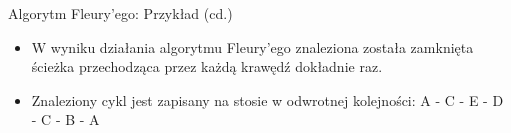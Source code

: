 \documentclass[polish,envcountsect,10pt]{beamer}
\begin{document}
\begin{frame}{Algorytm Fleury'ego: Przykład (cd.)}
    \begin{itemize}
        \item W wyniku działania algorytmu Fleury'ego znaleziona została zamknięta ścieżka przechodząca przez każdą krawędź dokładnie raz.
        \item Znaleziony cykl jest zapisany na stosie w odwrotnej kolejności: A - C - E - D - C - B - A
    \end{itemize}
    \begin{center}
    \end{center}
\end{frame}
\end{document}
